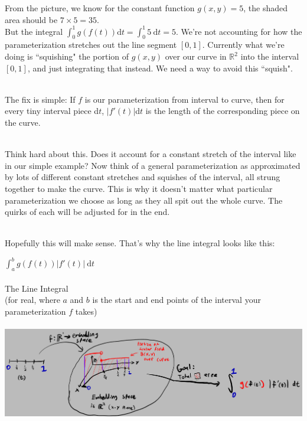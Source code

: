 \documentclass{article}
\newcommand{\R}{\mathbb{R}}
\newcommand{\ch}[1]{\text{#1}}
\newcommand{\dspt}{\displaystyle}
\begin{document}
\begin{flushleft}
{From the picture, we know for the constant function $g(x,y) = 5$, the shaded area should be $7\times 5 = 35$.\\But the integral $\dspt \int_0^1 g(f(t)) \ch{d}t = \int_0^1 5\ \ch{d}t = 5$. We're not accounting for how the parameterization stretches out the line segment $[0,1]$. Currently what we're doing is ``squishing" the portion of $g(x,y)$ over our curve in $\R^2$ into the interval $[0,1]$, and just integrating that instead. We need a way to avoid this ``squish".\\\ 

The fix is simple: If $f$ is our parameterization from interval to curve, then for every tiny interval piece d$t$, $|f'(t)|$d$t$ is the length of the corresponding piece on the curve.\\\ 

Think hard about this. Does it account for a constant stretch of the interval like in our simple example? Now think of a general parameterization as approximated by lots of different constant stretches and squishes of the interval, all strung together to make the curve. This is why it doesn't matter what particular parameterization we choose as long as they all spit out the whole curve. The quirks of each will be adjusted for in the end.\\\ 

Hopefully this will make sense. That's why the line integral looks like this:
\begin{center}$\dspt \int_a^b g(f(t))|f'(t)|\ \ch{d}t$\\\ \\The Line Integral\\(for real, where $a$ and $b$ is the start and end points of the interval your parameterization $f$ takes)\\\ \\	\includegraphics[width=16cm]{whole}\end{center}\ \\\ 

}
\end{flushleft}
\end{document}
